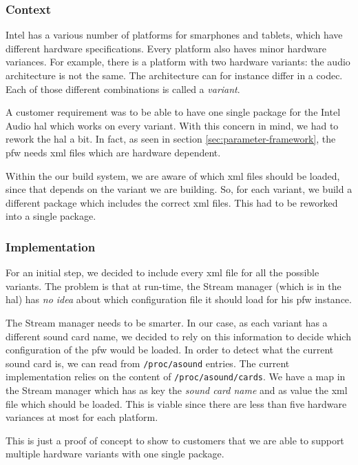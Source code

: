 \subsubsection{Context}
Intel has a various number of platforms for smarphones and tablets, which have different hardware specifications.
Every platform also haves minor hardware variances.
For example, there is a platform with two hardware variants: the audio architecture is not the same.
The architecture can for instance differ in a codec. Each of those different combinations is called a \emph{variant}.

A customer requirement was to be able to have one single package for the Intel Audio \gls{hal} which works on every variant.
With this concern in mind, we had to rework the \gls{hal} a bit.
In fact, as seen in section \ref{sec:parameter-framework}, the \gls{pfw} needs \gls{xml} files which are hardware dependent.

Within the our build system, we are aware of which \gls{xml} files should be loaded, since that depends on the variant we are building.
So, for each variant, we build a different package which includes the correct \gls{xml} files.
This had to be reworked into a single package.

\subsubsection{Implementation}
For an initial step, we decided to include every \gls{xml} file for all the possible variants.
The problem is that at run-time, the Stream manager (which is in the \gls{hal}) has \emph{no idea} about which configuration file
it should load for his \gls{pfw} instance.

The Stream manager needs to be smarter. In our case, as each variant has a different sound card name, we decided to
rely on this information to decide which configuration of the \gls{pfw} would be loaded.
In order to detect what the current sound card is, we can read from \lstinline{/proc/asound} entries.
The current implementation relies on the content of \lstinline{/proc/asound/cards}.
We have a map in the Stream manager which has as key the \emph{sound card name} and as value the \gls{xml} file which should be loaded.
This is viable since there are less than five hardware variances at most for each platform.

This is just a proof of concept to show to customers that we are able to support multiple hardware variants with one single package.


